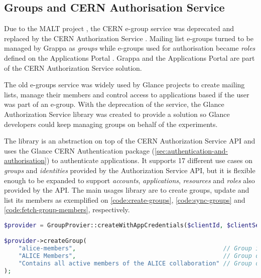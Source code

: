 \subsection{Groups and CERN Authorisation Service}

Due to the MALT project \cite{malt}, the CERN e-group service was deprecated and replaced by the CERN Authorization Service \cite{cern-authorization-service}. Mailing list e-groups turned to be managed by Grappa \cite{grappa-website} as \textit{groups} while e-groups used for authorisation became \textit{roles} defined on the Applications Portal \cite{applications-portal}. Grappa and the Applications Portal are part of the CERN Authorization Service solution.

The old e-groups service was widely used by Glance projects to create mailing lists, manage their members and control access to applications based if the user was part of an e-group. With the deprecation of the service, the Glance Authorization Service library \cite{glance-authz-service} was created to provide a solution so Glance developers could keep managing groups on behalf of the experiments.

The library is an abstraction on top of the CERN Authorization Service API \cite{authz-service-api} and uses the Glance CERN Authentication package (\autoref{sec:authentication-and-authorisation}) to authenticate applications. It supports 17 different use cases on \textit{groups} and \textit{identities} provided by the Authorization Service API, but it is flexible enough to be expanded to support \textit{accounts}, \textit{applications}, \textit{resources} and \textit{roles} also provided by the API.  The main usages library are to create groups, update and list its members as exemplified on \autoref{code:create-groups}, \autoref{code:sync-groups} and \autoref{code:fetch-group-members}, respectively.

\begin{lstlisting}[language=PHP,label={code:create-groups},caption={Example of how to create groups using the Authorization Service package.}]
$provider = GroupProvier::createWithAppCredentials($clientId, $clientSecret);

$provider->createGroup(
	"alice-members",                                         // Group identifier
	"ALICE Members",                                         // Group display name
	"Contains all active members of the ALICE collaboration" // Group description
);
\end{lstlisting}

